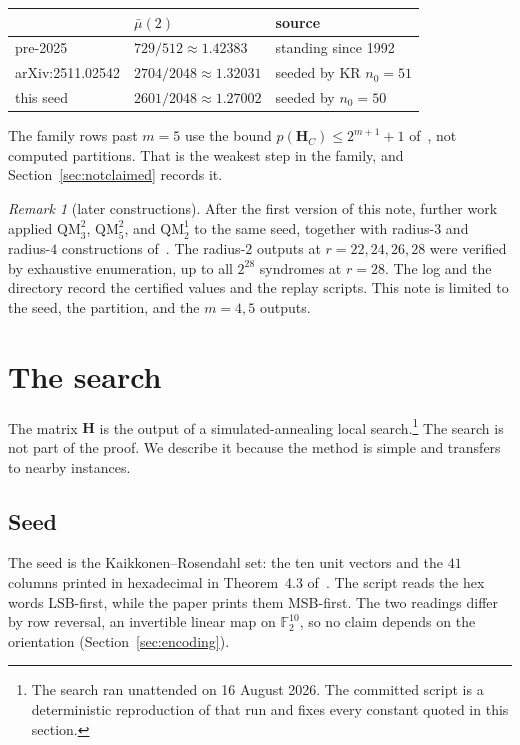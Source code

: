 \documentclass[11pt,a4paper]{article}
\newcommand{\FF}{\mathbb{F}}
\newcommand{\HH}{\boldsymbol{H}}
\theoremstyle{remark}
\newtheorem{remark}{Remark}
\begin{document}
\begin{center}
\renewcommand{\arraystretch}{1.15}
\begin{tabular}{@{}lll@{}}
\toprule
 & $\bar\mu(2)$ & source \\
\midrule
pre-2025 & $729/512\approx 1.42383$ & standing since 1992 \\
arXiv:2511.02542 & $2704/2048\approx 1.32031$ & seeded by KR $n_0=51$ \\
this seed & $2601/2048\approx 1.27002$ & seeded by $n_0=50$ \\
\bottomrule
\end{tabular}
\end{center}

The family rows past $m=5$ use the bound $p(\HH_C)\le 2^{m+1}+1$
of~\cite{DMP2025}, not computed partitions. That is the weakest step in
the family, and Section~\ref{sec:notclaimed} records it.

\begin{remark}[later constructions]
\label{rem:later}
After the first version of this note, further work applied
$\mathrm{QM}_3^2$, $\mathrm{QM}_5^2$, and $\mathrm{QM}_2^1$ to the same
seed, together with radius-$3$ and radius-$4$ constructions
of~\cite{DMP2025}. The radius-$2$ outputs at $r=22,24,26,28$ were
verified by exhaustive enumeration, up to all $2^{28}$ syndromes at
$r=28$. The log  and the directory 
record the certified values and the replay scripts. This note is
limited to the seed, the partition, and the $m=4,5$ outputs.
\end{remark}

\section{The search}
\label{sec:search}

The matrix $\HH$ is the output of a simulated-annealing local
search.\footnote{The search ran unattended on 16 August 2026. The
committed script  is a deterministic
reproduction of that run and fixes every constant quoted in this
section.} The search is not part of the proof. We describe it because
the method is simple and transfers to nearby instances.

\subsection{Seed}

The seed is the Kaikkonen--Rosendahl set: the ten unit vectors and the
$41$ columns printed in hexadecimal in Theorem~4.3 of~\cite{DMP2025}.
The script reads the hex words LSB-first, while the paper prints them
MSB-first. The two readings differ by row reversal, an invertible
linear map on $\FF_2^{10}$, so no claim depends on the orientation
(Section~\ref{sec:encoding}).
\end{document}
